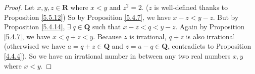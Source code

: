 \begin{proof}
    Let \(x, y, z \in \mathbf{R}\) where \(x < y\) and \(z^2 = 2\).
    (\(z\) is well-defined thanks to Proposition \ref{5.5.12})
    So by Proposition \ref{5.4.7}, we have \(x - z < y - z\).
    But by Proposition \ref{5.4.14}, \(\exists\ q \in \mathbf{Q}\) such that \(x - z < q < y - z\).
    Again by Proposition \ref{5.4.7}, we have \(x < q + z < y\).
    Because \(z\) is irrational, \(q + z\) is also irrational
    (otherwised we have \(a = q + z \in \mathbf{Q}\) and \(z = a - q \in \mathbf{Q}\), contradicts to Proposition \ref{4.4.4}).
    So we have an irrational number in between any two real numbers \(x, y\) where \(x < y\).
\end{proof}
